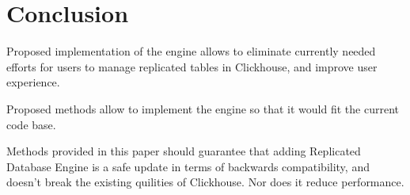 \documentclass[conference]{IEEEtran}
\begin{document}
\section{Conclusion}
Proposed implementation of the engine allows to eliminate
currently needed efforts for users to manage replicated tables in Clickhouse,
and improve user experience.

Proposed methods allow to implement the engine so that it would fit the current
code base.

Methods provided in this paper should guarantee that adding Replicated Database
Engine is a safe update in terms of backwards compatibility, and doesn't break 
the existing quilities of Clickhouse. Nor does it reduce performance.


%
%
%
%
%
\end{document}
